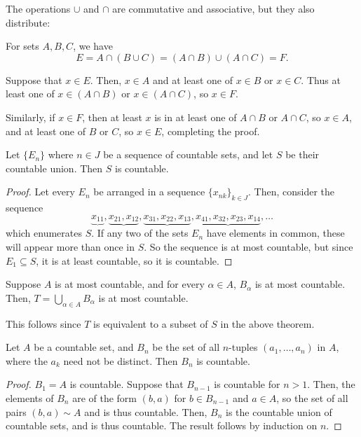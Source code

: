 The operations $\cup$ and $\cap$ are commutative and associative, but they also distribute:

\begin{theorem}
For sets $A, B, C$, we have
\[
	E = A \cap (B \cup C) = (A \cap B) \cup (A \cap C) = F.
\]

Suppose that $x \in E$. Then, $x \in A$ and at least one of $x \in B$ or $x \in C$. Thus at least one of $x \in (A \cap B)$ or $x \in (A \cap C)$, so $x \in F$.

Similarly, if $x \in F$, then at least $x$ is in at least one of $A \cap B$ or $A \cap C$, so $x \in A$, and at least one of $B$ or $C$, so $x \in E$, completing the proof.
\end{theorem}

\begin{theorem}
Let $\{E_n\}$ where $n \in J$ be a sequence of countable sets, and let $S$ be their countable union. Then $S$ is countable.

\begin{proof}
Let every $E_n$ be arranged in a sequence $\{x_{nk}\}_{k \in J}$. Then, consider the sequence
\[
	\underbrace{x_{11}}, \underbrace{x_{21}, x_{12}}, \underbrace{x_{31}, x_{22}, x_{13}}, \underbrace{x_{41}, x_{32}, x_{23}, x_{14}}, \dotsc
\]
which enumerates $S$. If any two of the sets $E_n$ have elements in common, these will appear more than once in $S$. So the sequence is at most countable, but since $E_1 \subseteq S$, it is at least countable, so it is countable.
\end{proof}
\end{theorem}

\begin{corollary}
Suppose $A$ is at most countable, and for every $\alpha \in A$, $B_\alpha$ is at most countable. Then, $T = \bigcup_{\alpha \in A} B_\alpha$ is at most countable.

This follows since $T$ is equivalent to a subset of $S$ in the above theorem.
\end{corollary}

\begin{theorem}
Let $A$ be a countable set, and $B_n$ be the set of all $n$-tuples $(a_1, \dotsc, a_n)$ in $A$, where the $a_k$ need not be distinct. Then $B_n$ is countable.

\begin{proof}
$B_1 = A$ is countable. Suppose that $B_{n-1}$ is countable for $n > 1$. Then, the elements of $B_n$ are of the form $(b, a)$ for $b \in B_{n-1}$ and $a \in A$, so the set of all pairs $(b, a) \sim A$ and is thus countable. Then, $B_n$ is the countable union of countable sets, and is thus countable. The result follows by induction on $n$.
\end{proof}
\end{theorem}

